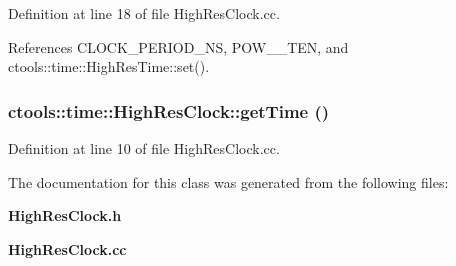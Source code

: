 Definition at line 18 of file High\-Res\-Clock.cc.

References CLOCK\_\-PERIOD\_\-NS, POW\_\_\-TEN, and ctools::time::High\-Res\-Time::set().
\subsubsection{ ctools::time::High\-Res\-Clock::get\-Time ()\hspace{0.3cm}{\tt  [static]}}\label{classctools_1_1time_1_1HighResClock_e0}




Definition at line 10 of file High\-Res\-Clock.cc.

The documentation for this class was generated from the following files:\begin{CompactItemize}
\item 
{\bf High\-Res\-Clock.h}\item 
{\bf High\-Res\-Clock.cc}\end{CompactItemize}
